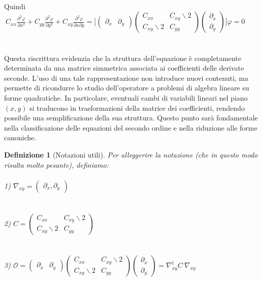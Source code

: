 \documentclass[a4paper,12pt]{report}
\newtheorem{definizione}{Definizione}[chapter]
\newcommand{\pdd}[2]{\frac{\partial^2 #1}{\partial #2^2}}
\newcommand{\pdm}[3]{\frac{\partial^2 #1}{\partial #2 \partial #3}}
\begin{document}
\\
\\
\\Quindi $ \ \displaystyle C_{xx}\pdd{\varphi}{x}+C_{yy}\pdd{\varphi}{y} +C_{xy}\pdm{\varphi}{x}{y}=\bigg[\begin{pmatrix}
    \partial_x & \partial_y
\end{pmatrix}\begin{pmatrix}
    C_{xx} & C_{xy}\backslash2\\
    C_{xy}\backslash2 & C_{yy}
\end{pmatrix}\begin{pmatrix}
    \partial_x\\
    \partial_y
\end{pmatrix}\bigg]\varphi=0$
\\
\\
\\Questa riscrittura evidenzia che la struttura dell’equazione è completamente determinata da una matrice simmetrica associata ai coefficienti delle derivate seconde. L’uso di una tale rappresentazione non introduce nuovi contenuti, ma permette di ricondurre lo studio dell’operatore a problemi di algebra lineare su forme quadratiche. In particolare, eventuali cambi di variabili lineari nel piano $(x,y)$ si traducono in trasformazioni della matrice dei coefficienti, rendendo possibile una semplificazione della sua struttura. Questo punto sarà fondamentale nella classificazione delle equazioni del secondo ordine e nella riduzione alle forme canoniche.

\vspace{0.5cm}

\begin{definizione}[Notazioni utili]\label{def: 4.2}
    Per alleggerire la notazione (che in questo modo risulta molto pesante), definiamo:
    \\
    \\ 1) $\nabla_{xy} =\begin{pmatrix}
    \partial_x , \partial_y
    \end{pmatrix}$
    \\
    \\
    \\ 2) $C=\begin{pmatrix}
    C_{xx} & C_{xy}\backslash2\\
    C_{xy}\backslash2 & C_{yy}
    \end{pmatrix}$
    \\ 
    \\
    \\ 3) $\mathcal{O}=\begin{pmatrix}
    \partial_x & \partial_y
\end{pmatrix}\begin{pmatrix}
    C_{xx} & C_{xy}\backslash2\\
    C_{xy}\backslash2 & C_{yy}
\end{pmatrix}\begin{pmatrix}
    \partial_x\\
    \partial_y
\end{pmatrix}=\nabla^t_{xy}C\ \nabla_{xy}$

\end{definizione}
\end{document}
